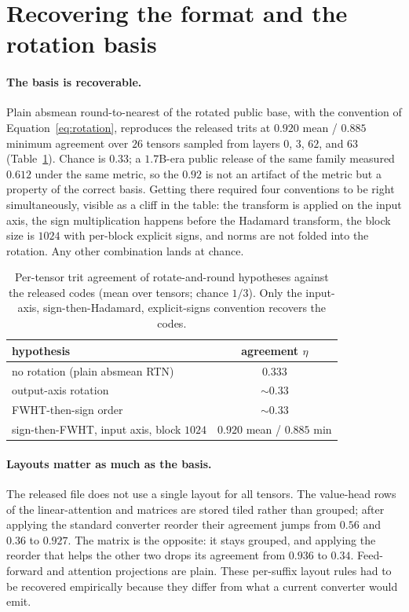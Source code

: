 \section{Recovering the format and the rotation basis}
\label{sec:format}

\paragraph{The basis is recoverable.}
Plain absmean round-to-nearest of the rotated public base, with the convention
of Equation~\ref{eq:rotation}, reproduces the released trits at
$0.920$ mean / $0.885$ minimum agreement over $26$ tensors sampled from layers
$0$, $3$, $62$, and $63$ (Table~\ref{tab:gate1}). Chance is $0.33$; a
$1.7$B-era public release of the same family measured $0.612$ under the same
metric, so the $0.92$ is not an artifact of the metric but a property of the
correct basis. Getting there required four conventions to be right
simultaneously, visible as a cliff in the table: the transform is applied on
the input axis, the sign multiplication happens before the Hadamard transform,
the block size is $1024$ with per-block explicit signs, and norms are not
folded into the rotation. Any other combination lands at chance.

\begin{table}[t]
\caption{Per-tensor trit agreement of rotate-and-round hypotheses against the
released codes (mean over tensors; chance $1/3$). Only the input-axis,
sign-then-Hadamard, explicit-signs convention recovers the codes.}
\label{tab:gate1}
\begin{center}
\begin{tabular}{lc}
\toprule
hypothesis & agreement $\eta$ \\
\midrule
no rotation (plain absmean RTN) & $0.333$ \\
output-axis rotation & $\sim 0.33$ \\
FWHT-then-sign order & $\sim 0.33$ \\
sign-then-FWHT, input axis, block $1024$ & $\mathbf{0.920}$ mean / $0.885$ min \\
\bottomrule
\end{tabular}
\end{center}
\end{table}

\paragraph{Layouts matter as much as the basis.}
The released file does not use a single layout for all tensors. The
value-head rows of the linear-attention  and
 matrices are stored tiled rather than grouped; after
applying the standard converter reorder their agreement jumps from $0.56$ and
$0.36$ to $0.927$. The  matrix is the opposite: it stays
grouped, and applying the reorder that helps the other two drops its agreement
from $0.936$ to $0.34$. Feed-forward and attention projections are plain.
These per-suffix layout rules had to be recovered empirically because they
differ from what a current converter would emit.

